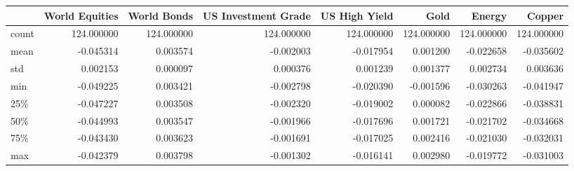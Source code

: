 \begin{tabular}{lrrrrrrr}
\toprule
{} &  World Equities &  World Bonds &  US Investment Grade &  US High Yield &        Gold &      Energy &      Copper \\
\midrule
count &      124.000000 &   124.000000 &           124.000000 &     124.000000 &  124.000000 &  124.000000 &  124.000000 \\
mean  &       -0.045314 &     0.003574 &            -0.002003 &      -0.017954 &    0.001200 &   -0.022658 &   -0.035602 \\
std   &        0.002153 &     0.000097 &             0.000376 &       0.001239 &    0.001377 &    0.002734 &    0.003636 \\
min   &       -0.049225 &     0.003421 &            -0.002798 &      -0.020390 &   -0.001596 &   -0.030263 &   -0.041947 \\
25\%   &       -0.047227 &     0.003508 &            -0.002320 &      -0.019002 &    0.000082 &   -0.022866 &   -0.038831 \\
50\%   &       -0.044993 &     0.003547 &            -0.001966 &      -0.017696 &    0.001721 &   -0.021702 &   -0.034668 \\
75\%   &       -0.043430 &     0.003623 &            -0.001691 &      -0.017025 &    0.002416 &   -0.021030 &   -0.032031 \\
max   &       -0.042379 &     0.003798 &            -0.001302 &      -0.016141 &    0.002980 &   -0.019772 &   -0.031003 \\
\bottomrule
\end{tabular}
